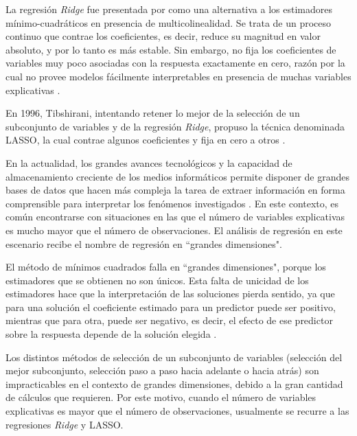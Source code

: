 \documentclass[a4paper,12pt]{report}
\begin{document}
La regresión \textit{Ridge} fue presentada por \citet{hoerl1970ridge} como una alternativa a los estimadores mínimo-cuadráticos en presencia de multicolinealidad. Se trata de un proceso continuo que contrae los coeficientes, es decir, reduce su magnitud en valor absoluto, y por lo tanto es más estable. Sin embargo, no fija los coeficientes de variables muy poco asociadas con la respuesta exactamente en cero, razón por la cual no provee modelos fácilmente interpretables en presencia de muchas variables explicativas \citep{tibshirani1996regression}.

En 1996, Tibshirani, intentando retener lo mejor de la selección de un subconjunto de variables y de la regresión \textit{Ridge}, propuso la técnica denominada LASSO, la cual contrae algunos coeficientes y fija en cero a otros \citep{tibshirani1996regression}.

En la actualidad, los grandes avances tecnológicos y la capacidad de almacenamiento creciente de los medios informáticos permite disponer de grandes bases de datos que hacen más compleja la tarea de extraer información en forma comprensible para interpretar los fenómenos investigados \citep{nisbet2009handbook} \citep{han2011data} \citep{leskovec2014mining} \citep{larose2015data}. En este contexto, es común encontrarse con situaciones en las que el número de variables explicativas es mucho mayor que el número de observaciones. El análisis de regresión en este escenario recibe el nombre de regresión en ``grandes dimensiones".

El método de mínimos cuadrados falla en ``grandes dimensiones", porque los estimadores que se obtienen no son únicos. Esta falta de unicidad de los estimadores hace que la interpretación de las soluciones pierda sentido, ya que para una solución el coeficiente estimado para un predictor puede ser positivo, mientras que para otra, puede ser negativo, es decir, el efecto de ese predictor sobre la respuesta depende de la solución elegida \citep{friedman2001elements}.

Los distintos métodos de selección de un subconjunto de variables (selección del mejor subconjunto, selección paso a paso hacia adelante o hacia atrás) son impracticables en el contexto de grandes dimensiones, debido a la gran cantidad de cálculos que requieren. Por este motivo, cuando el número de variables explicativas es mayor que el número de observaciones, usualmente se recurre a las regresiones \textit{Ridge} y LASSO.
\end{document}

